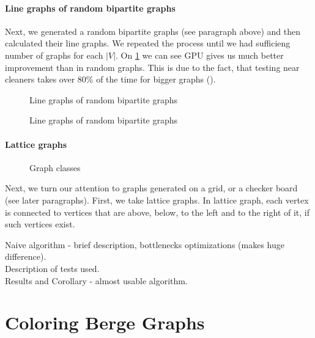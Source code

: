 \paragraph{Line graphs of random bipartite graphs}
Next, we generated a random bipartite graphs (see paragraph above) and then calculated their line graphs. We repeated the process until we had sufficieng number of graphs for each $|V|$. On \cref{plot:perf2Lines} we can see GPU gives us much better improvement than in random graphs. This is due to the fact, that testing near cleaners takes over 80\% of the time for bigger graphs ().

\begin{figure}
  \centering
  
  \caption{Line graphs of random bipartite graphs}
  \label{plot:perf2Lines}
\end{figure}

\begin{figure}
  \centering
  
  \caption{Line graphs of random bipartite graphs}
  \label{plot:perf2Det}
\end{figure}

\paragraph{Lattice graphs}

\begin{figure}

\caption{Graph classes}
\end{figure}

Next, we turn our attention to graphs generated on a grid, or a checker board (see later paragraphs). First, we take lattice graphs. In lattice graph, each vertex is connected to vertices that are above, below, to the left and to the right of it, if such vertices exist.

Naive algorithm - brief description, bottlenecks optimizations (makes huge difference).\\

Description of tests used.\\

Results and Corollary - almost usable algorithm.


\section{Coloring Berge Graphs}

